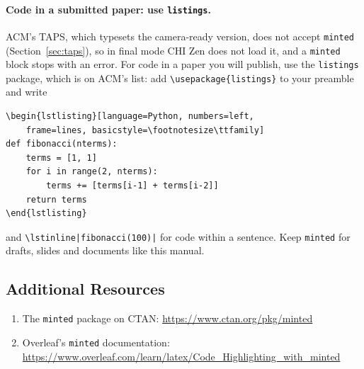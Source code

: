 \paragraph{Code in a submitted paper: use \texttt{listings}.} ACM's TAPS, which typesets the camera-ready version, does not accept \texttt{minted} (Section~\ref{sec:taps}), so in final mode CHI Zen does not load it, and a \texttt{minted} block stops with an error. For code in a paper you will publish, use the \texttt{listings} package, which is on ACM's list: add \texttt{\textbackslash usepackage\{listings\}} to your preamble and write
\begin{verbatim}
\begin{lstlisting}[language=Python, numbers=left,
    frame=lines, basicstyle=\footnotesize\ttfamily]
def fibonacci(nterms):
    terms = [1, 1]
    for i in range(2, nterms):
        terms += [terms[i-1] + terms[i-2]]
    return terms
\end{lstlisting}
\end{verbatim}
and \texttt{\textbackslash lstinline|fibonacci(100)|} for code within a sentence. Keep \texttt{minted} for drafts, slides and documents like this manual.

\subsection*{Additional Resources}

\begin{enumerate}
    \item The \texttt{minted} package on CTAN: \href{https://www.ctan.org/pkg/minted}{https://www.ctan.org/pkg/minted}
    \item Overleaf's \texttt{minted} documentation: \href{https://www.overleaf.com/learn/latex/Code\_Highlighting\_with\_minted}{https://www.overleaf.com/learn/latex/Code\_Highlighting\_with\_minted}
\end{enumerate}